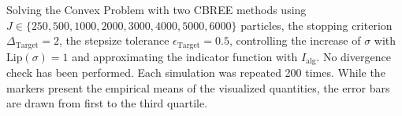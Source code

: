 Solving the Convex Problem with two CBREE methods using  $J \in \{250, 500, 1000, 2000, 3000, 4000, 5000, 6000\}$ particles, the stopping criterion $\Delta_{\text{Target}} = 2$, the stepsize tolerance $\epsilon_{\text{Target}} = 0.5$, controlling the increase of $\sigma$ with $\text{Lip}(\sigma) = 1$ and approximating the indicator function with $I_\text{alg}$. No divergence check has been performed. Each simulation was repeated 200 times. While the markers present the empirical means of the visualized quantities, the error bars are drawn from first to the third quartile.